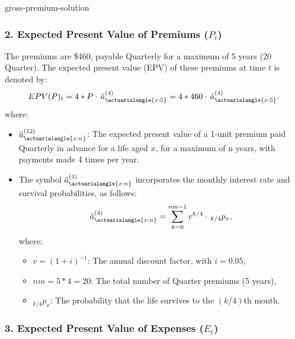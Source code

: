 \begin{solve}{}{gross-premium-solution}
		\subsubsection*{2. Expected Present Value of Premiums (\(P_t\))}
		
		The premiums are \$460, payable Quarterly for a maximum of 5 years (20 Quarter). The expected present value (EPV) of these premiums at time \(t\) is denoted by:
		\[
		EPV(P)_t = 4 * P \cdot \, \ddot{a}_{\actuarialangle{x:5}}^{(4)} = 4 * 460 \cdot \, \ddot{a}_{\actuarialangle{x:5}}^{(4)}.
		\]
		where:
		\begin{itemize}
			\item \(\ddot{a}_{\actuarialangle{x:n}}^{(12)}\): The expected present value of a 1-unit premium paid Quarterly in advance for a life aged \(x\), for a maximum of n years, with payments made 4 times per year.
			\item The symbol \(\ddot{a}_{\actuarialangle{x:n}}^{(4)}\) incorporates the monthly interest rate and survival probabilities, as follows:
			\[
			\ddot{a}_{\actuarialangle{x:n}}^{(4)} = \sum_{k=0}^{nm-1} v^{k/4} \cdot \, _{k/4}p_x,
			\]
			where:
			\begin{itemize}
				\item \(v = (1+i)^{-1}\): The annual discount factor, with \(i = 0.05\),
				\item \(nm = 5*4 = 20\): The total number of Quarter premiums (5 years),
				\item \(_{k/4}p_x\): The probability that the life survives to the \((k/4)\)th month.
			\end{itemize}
		\end{itemize}
		
		\subsubsection*{3. Expected Present Value of Expenses (\(E_t\))}
		

\end{solve}

